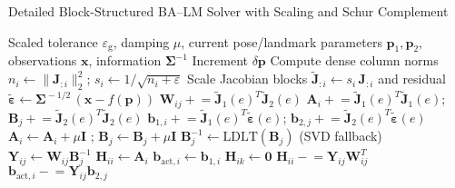 \begin{algorithm}[H]
\caption{Detailed Block-Structured BA--LM Solver with Scaling and Schur Complement}
\begin{algorithmic}[1]
\small
\Require Scaled tolerance $\varepsilon_{\mathrm{g}}$, damping $\mu$, current pose/landmark parameters $\mathbf{p}_1,\mathbf{p}_2$, observations $\mathbf{x}$, information $\boldsymbol{\Sigma}^{-1}$
\Ensure Increment $\delta\mathbf{p}$
\State Compute dense column norms $n_i \gets \lVert \mathbf{J}_{:i} \rVert_2^2$; $s_i \gets 1/\sqrt{n_i+\varepsilon}$
\State Scale Jacobian blocks $\widetilde{\mathbf{J}}_{:i} \gets s_i\,\mathbf{J}_{:i}$ and residual $\widetilde{\boldsymbol{\varepsilon}} \gets \boldsymbol{\Sigma}^{\!-1/2}\,(\mathbf{x}-f(\mathbf{p}))$
  \State $\mathbf{W}_{ij} \mathrel{+}= \widetilde{\mathbf{J}}_{1}(e)^{T}\widetilde{\mathbf{J}}_{2}(e)$
  \State $\mathbf{A}_{i} \mathrel{+}= \widetilde{\mathbf{J}}_{1}(e)^{T}\widetilde{\mathbf{J}}_{1}(e)$;
  $\mathbf{B}_{j} \mathrel{+}= \widetilde{\mathbf{J}}_{2}(e)^{T}\widetilde{\mathbf{J}}_{2}(e)$
  \State $\mathbf{b}_{1,i} \mathrel{+}= \widetilde{\mathbf{J}}_{1}(e)^{T}\widetilde{\boldsymbol{\varepsilon}}(e)$;
  $\mathbf{b}_{2,j} \mathrel{+}= \widetilde{\mathbf{J}}_{2}(e)^{T}\widetilde{\boldsymbol{\varepsilon}}(e)$
\EndFor
 $\mathbf{A}_{i} \gets \mathbf{A}_{i}+\mu\mathbf{I}$ \EndFor;
 $\mathbf{B}_{j} \gets \mathbf{B}_{j}+\mu\mathbf{I}$ \EndFor
 $\mathbf{B}^{-1}_{j} \gets \text{LDLT}(\mathbf{B}_j)$ (SVD fallback) \EndFor
{} $\mathbf{Y}_{ij} \gets \mathbf{W}_{ij}\mathbf{B}^{-1}_{j}$ \EndFor
  \State $\mathbf{H}_{ii} \gets \mathbf{A}_{i}$
  \State $\mathbf{b}_{\mathrm{act},i} \gets \mathbf{b}_{1,i}$
\EndFor
{}
  \State $\mathbf{H}_{ik} \gets \mathbf{0}$
\EndFor
{}
  \State $\mathbf{H}_{ii} \mathrel{-}= \mathbf{Y}_{ij}\mathbf{W}_{ij}^T$
  \State $\mathbf{b}_{\mathrm{act},i} \mathrel{-}= \mathbf{Y}_{ij}\mathbf{b}_{2,j}$

\end{algorithmic}
\end{algorithm}
